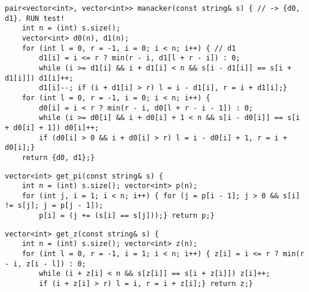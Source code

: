 \documentclass[12pt]{article}
\begin{document}
\begin{verbatim}
pair<vector<int>, vector<int>> manacker(const string& s) { // -> {d0, d1}. RUN test!
    int n = (int) s.size();
    vector<int> d0(n), d1(n);
    for (int l = 0, r = -1, i = 0; i < n; i++) { // d1
        d1[i] = i <= r ? min(r - i, d1[l + r - i]) : 0;
        while (i >= d1[i] && i + d1[i] < n && s[i - d1[i]] == s[i + d1[i]]) d1[i]++;
        d1[i]--; if (i + d1[i] > r) l = i - d1[i], r = i + d1[i];}
    for (int l = 0, r = -1, i = 0; i < n; i++) {
        d0[i] = i < r ? min(r - i, d0[l + r - i - 1]) : 0;
        while (i >= d0[i] && i + d0[i] + 1 < n && s[i - d0[i]] == s[i + d0[i] + 1]) d0[i]++;
        if (d0[i] > 0 && i + d0[i] > r) l = i - d0[i] + 1, r = i + d0[i];}
    return {d0, d1};}
\end{verbatim}

\begin{verbatim}
vector<int> get_pi(const string& s) {
    int n = (int) s.size(); vector<int> p(n);
    for (int j, i = 1; i < n; i++) { for (j = p[i - 1]; j > 0 && s[i] != s[j]; j = p[j - 1]);
        p[i] = (j += (s[i] == s[j]));} return p;}
\end{verbatim}

\begin{verbatim}
vector<int> get_z(const string& s) {
    int n = (int) s.size(); vector<int> z(n);
    for (int l = 0, r = -1, i = 1; i < n; i++) { z[i] = i <= r ? min(r - i, z[i - l]) : 0;
        while (i + z[i] < n && s[z[i]] == s[i + z[i]]) z[i]++;
        if (i + z[i] > r) l = i, r = i + z[i];} return z;}
\end{verbatim}
\end{document}
